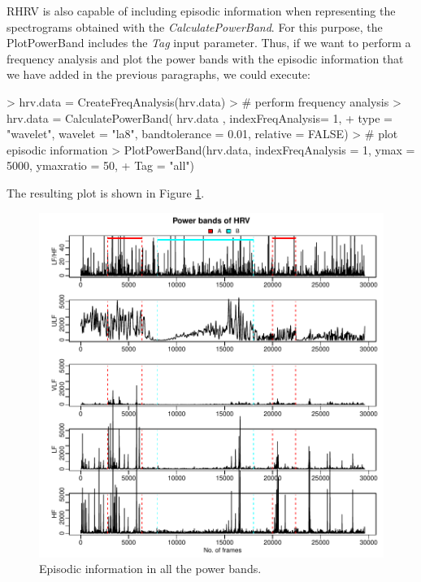 \documentclass[12pt,lot, lof]{puthesis}
\begin{document}
RHRV is also capable of  including episodic information when representing the 
spectrograms obtained with the
\textit{CalculatePowerBand}. For this purpose, the {PlotPowerBand} includes the 
\textit{Tag} input parameter. Thus, if we want to perform a frequency analysis 
and plot the power bands with the episodic information that we have added in 
the previous paragraphs, we could execute:
\begin{Schunk}
\begin{Sinput}
> hrv.data = CreateFreqAnalysis(hrv.data)
> # perform frequency analysis
> hrv.data = CalculatePowerBand( hrv.data , indexFreqAnalysis= 1,
+  type = "wavelet", wavelet = "la8", bandtolerance = 0.01, relative = FALSE)
> # plot episodic information
> PlotPowerBand(hrv.data, indexFreqAnalysis = 1, ymax = 5000, ymaxratio = 50, 
+   			Tag = "all")
\end{Sinput}
\end{Schunk}
The resulting plot is shown in Figure \ref{fig:episodicFrequency}.
\begin{figure}[h]
\centering
\includegraphics{figures/tutorial-episodicFrequency}
\caption{Episodic information in all the power 
bands.\label{fig:episodicFrequency}}
\end{figure}
\end{document}
